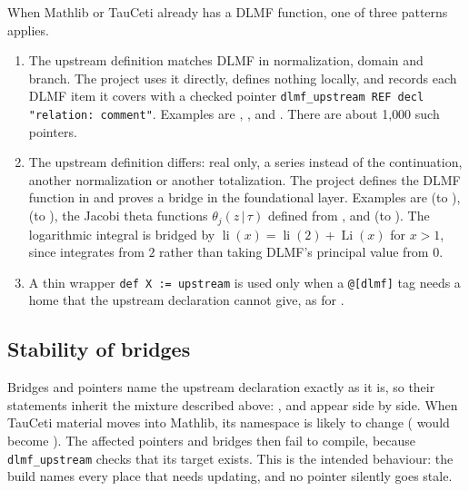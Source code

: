 \documentclass[11pt,a4paper]{article}
\begin{document}
When Mathlib or TauCeti already has a DLMF function, one of three patterns applies.
\begin{enumerate}
  \item The upstream definition matches DLMF in normalization, domain and branch. The project
    uses it directly, defines nothing locally, and records each DLMF item it covers with a
    checked pointer \texttt{dlmf\_upstream REF decl "relation: comment"}. Examples are
    , ,  and
    . There are about 1{,}000 such pointers.
  \item The upstream definition differs: real only, a series instead of the continuation,
    another normalization or another totalization. The project defines the DLMF function in
     and proves a bridge in the foundational layer. Examples are
     (to ),
     (to ), the Jacobi theta functions
    $\theta_j(z\,|\,\tau)$ defined from , and
     (to
    ). The logarithmic integral is bridged by
    $\operatorname{li}(x) = \operatorname{li}(2) + \operatorname{Li}(x)$ for $x > 1$, since
     integrates from $2$ rather than taking DLMF's principal
    value from $0$.
  \item A thin wrapper \texttt{def X := upstream} is used only when a \texttt{@[dlmf]} tag
    needs a home that the upstream declaration cannot give, as for
    .
\end{enumerate}

\subsection{Stability of bridges}

Bridges and pointers name the upstream declaration exactly as it is, so their statements
inherit the mixture described above: ,  and
 appear side by side. When TauCeti material moves into
Mathlib, its namespace is likely to change ( would become
). The affected pointers and bridges then fail to compile, because
\texttt{dlmf\_upstream} checks that its target exists. This is the intended behaviour: the
build names every place that needs updating, and no pointer silently goes stale.
\end{document}
